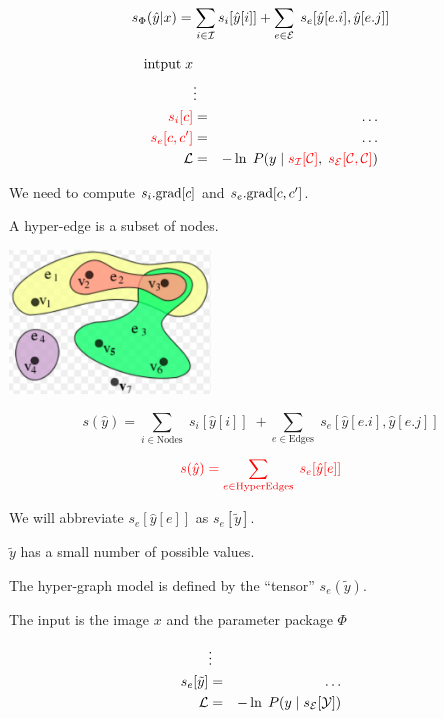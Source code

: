{\vfill
{\color{red} $$s_\Phi(\hat{y}|x) = \sum_{i \in {\cal I}} s_i[\hat{y}[i]] + \sum_{e \in {\cal E}}\;s_e[\hat{y}[e.i],\hat{y}[e.j]]$$}


\vfill
\begin{eqnarray*}
\mbox{intput}\; x \\
 & \vdots & \\
{\color{red} s_i[c]} & = & \ldots \\
{\color{red} s_e[c,c']} & = & \ldots \\
{\cal L} & = & - \ln\; P(y\;|\;{\color{red} s_{\cal I}[{\cal C}]},\;{\color{red} s_{\cal E}[{\cal C}, {\cal C}]})
\end{eqnarray*}

\vfill
We need to compute {\color{red} $s_i.\mathrm{grad}[c]$} and {\color{red} $s_e.\mathrm{grad}[c,c']$}.


A hyper-edge is a subset of nodes.

\vfill
\centerline{\includegraphics[height = 1.5in]{../images/HyperGraph}}


$$s(\hat{y}) = \sum_{i \in \mathrm{Nodes}}\; s_i[\hat{y}[i]]\; + \sum_{e \in \mathrm{Edges}}\;s_e[\hat{y}[e.i],\hat{y}[e.j]]$$

\vfill

$${\color{red} s(\hat{y}) = \sum_{e \in \mathrm{HyperEdges}}  \; s_e[\hat{y}[e]]}$$



We will abbreviate $s_e[\hat{y}[e]]$ as {\color{red} $s_e[\tilde{y}]$}.

\vfill
{\color{red} $\tilde{y}$ has a small number of possible values.}

\vfill
The hyper-graph model is defined by the ``tensor'' {\color{red} $s_e(\tilde{y})$}.



The input is the image $x$ and the parameter package $\Phi$

\begin{eqnarray*}
 & \vdots & \\
s_e[\tilde{y}] & = & \ldots \\
{\cal L} & = & - \ln\; P(y\;|\;s_{\cal E}[{\cal Y}])
\end{eqnarray*}

}

